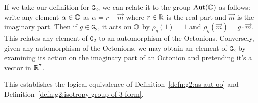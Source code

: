 If we take our definition for $\mathtt{G}_{2}$, we can relate it to the
group $\operatorname{Aut}(\mathbb{O})$ as follows: write any element $\alpha\in\mathbb{O}$ as
$\alpha=r+\vec{m}$ where $r\in\mathbb{R}$ is the real part and $\vec{m}$ is the
imaginary part. Then if $g\in\mathtt{G}_{2}$, it acts on $\mathbb{O}$ by
$\rho_{g}(1)=1$ and $\rho_{g}(\vec{m})=g\cdot\vec{m}$. This relates any
element of $\mathtt{G}_{2}$ to an automorphism of the
Octonions. Conversely, given any automorphism of the Octonions, we may
obtain an element of $\mathtt{G}_{2}$ by examining its action on the
imaginary part of an Octonion and pretending it's a vector in $\mathbb{R}^{7}$.

This establishes the logical equivalence of
Definition~\ref{defn:g2:as-aut-oo} and
Definition~\ref{defn:g2:isotropy-group-of-3-form}.

